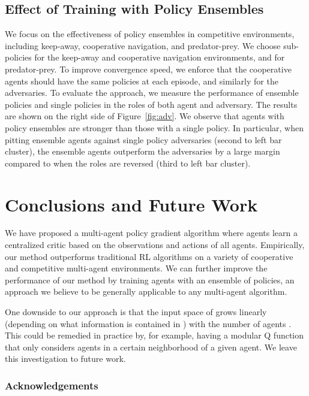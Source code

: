 \documentclass{article}
\begin{document}
\subsection{Effect of Training with Policy Ensembles}
We focus on the effectiveness of policy ensembles in competitive environments, including keep-away, cooperative navigation, and predator-prey. We choose  sub-policies for the keep-away and cooperative navigation environments, and  for predator-prey. To improve convergence speed, we enforce that the cooperative agents should have the same policies at each episode, and similarly for the adversaries.
To evaluate the approach, we measure the performance of ensemble policies and single policies in the roles of both agent and adversary. The results are shown on the right side of Figure~\ref{fig:adv}. We observe that agents with policy ensembles are stronger than those with a single policy. In particular, when pitting ensemble agents against single policy adversaries (second to left bar cluster), the ensemble agents outperform the adversaries by a large margin compared to when the roles are reversed (third to left bar cluster).



\section{Conclusions and Future Work}


We have proposed a multi-agent policy gradient algorithm where agents learn a centralized critic based on the observations and actions of all agents. Empirically, our method outperforms traditional RL algorithms on a variety of cooperative and competitive multi-agent environments. We can further improve the performance of our method by training agents with an ensemble of policies, an approach we believe to be generally applicable to any multi-agent algorithm.

One downside to our approach is that the input space of  grows linearly (depending on what information is contained in ) with the number of agents . This could be remedied in practice by, for example, having a modular Q function that only considers agents in a certain neighborhood of a given agent. We leave this investigation to future work. 





\subsubsection*{Acknowledgements}
\end{document}
